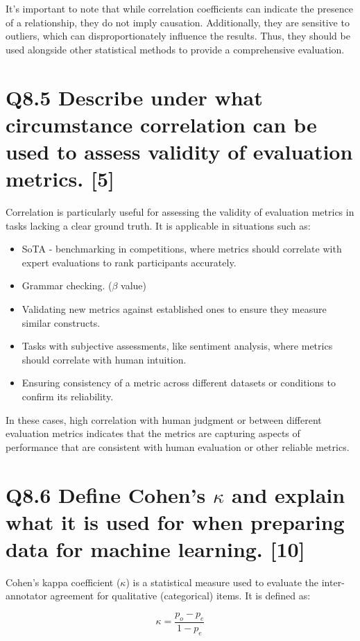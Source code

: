 \documentclass[11pt]{article}
\begin{document}
It's important to note that while correlation coefficients can indicate the presence of a relationship, they do not imply causation. Additionally, they are sensitive to outliers, which can disproportionately influence the results. Thus, they should be used alongside other statistical methods to provide a comprehensive evaluation.

\section{Q8.5 Describe under what circumstance correlation can be used to assess validity of evaluation metrics. [5]}

Correlation is particularly useful for assessing the validity of evaluation metrics in tasks lacking a clear ground truth. It is applicable in situations such as:

\begin{itemize}
\item SoTA - benchmarking in competitions, where metrics should correlate with expert evaluations to rank participants accurately.
\item Grammar checking. ($\beta$ value)
\item Validating new metrics against established ones to ensure they measure similar constructs.
\item Tasks with subjective assessments, like sentiment analysis, where metrics should correlate with human intuition.
\item Ensuring consistency of a metric across different datasets or conditions to confirm its reliability.
\end{itemize}

In these cases, high correlation with human judgment or between different evaluation metrics indicates that the metrics are capturing aspects of performance that are consistent with human evaluation or other reliable metrics.

\section{Q8.6 Define Cohen's \(\kappa\) and explain what it is used for when preparing data for machine learning. [10]}

Cohen's kappa coefficient (\(\kappa\)) is a statistical measure used to evaluate the inter-annotator agreement for qualitative (categorical) items. It is defined as:

\[
\kappa = \frac{p_o - p_e}{1 - p_e}
\]
\end{document}
